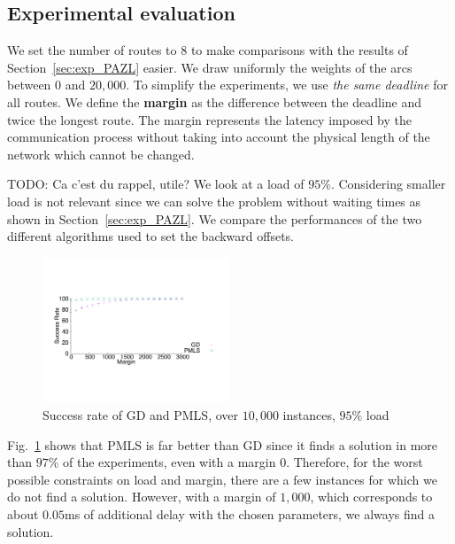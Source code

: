 \documentclass[10pt, conference, letterpaper]{IEEEtran}
\newcommand{\todo}[1]{{\color{red} TODO: {#1}}}
\begin{document}
     
    \subsection{Experimental evaluation}
    \label{sec:resultsPALL}
    
    We set the number of routes to $8$ to make comparisons with the results of Section~\ref{sec:exp_PAZL} easier. 
    We draw uniformly the weights of the arcs between $0$ and $20,000$. To simplify the experiments, 
    we use \emph{the same deadline} for all routes. We define the {\bf margin} as the difference between the deadline and twice the longest route. The margin represents the latency imposed by the communication process without taking into account the physical length of the network which cannot be changed.
  
   \todo{Ca c'est du rappel, utile?}
   We look at a load of $95\%$.
   Considering smaller load is not relevant since we can solve the problem without waiting times as shown in Section~\ref{sec:exp_PAZL}. 
      We compare the performances of the two different algorithms used to set the backward offsets.
      
     
    \begin{figure} [h] 
       \begin{center}
      \includegraphics[width=0.5\textwidth]{retour_21000.pdf}
      \end{center}
      \caption{Success rate of GD and PMLS, over $10,000$ instances, $95\%$ load}
     \label{fig:success21000}
     \end{figure}
     
Fig.~\ref{fig:success21000} shows that PMLS is far better than GD since it finds a solution in more than $97\%$ of the experiments, even with a margin $0$. Therefore, for the worst possible constraints on load and margin, there are a few instances for which we do not find a solution. However, with a margin of $1,000$, which corresponds to about $0.05$ms of additional delay with the chosen parameters, we always find a solution. 
\end{document}

